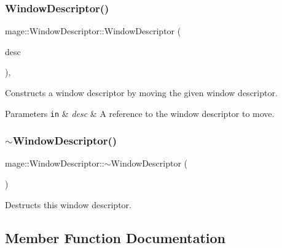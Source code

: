 \subsubsection{\texorpdfstring{Window\+Descriptor()}{WindowDescriptor()}\hspace{0.1cm}{\footnotesize\ttfamily [3/3]}}
{\footnotesize\ttfamily mage\+::\+Window\+Descriptor\+::\+Window\+Descriptor (\begin{DoxyParamCaption}\item[{\mbox{\hyperlink{classmage_1_1_window_descriptor}{Window\+Descriptor}} \&\&}]{desc }\end{DoxyParamCaption})\hspace{0.3cm}{\ttfamily [default]}, {\ttfamily [noexcept]}}

Constructs a window descriptor by moving the given window descriptor.


\begin{DoxyParams}[1]{Parameters}
\mbox{\tt in}  & {\em desc} & A reference to the window descriptor to move. \\
\hline
\end{DoxyParams}
\mbox{\label{classmage_1_1_window_descriptor_ac73160dd1e90b9acf819164b774d5709}} 
\subsubsection{\texorpdfstring{$\sim$\+Window\+Descriptor()}{~WindowDescriptor()}}
{\footnotesize\ttfamily mage\+::\+Window\+Descriptor\+::$\sim$\+Window\+Descriptor (\begin{DoxyParamCaption}{ }\end{DoxyParamCaption})}

Destructs this window descriptor. 

\subsection{Member Function Documentation}
\mbox{\label{classmage_1_1_window_descriptor_a09423845e3cc6bd451e280a92222ca14}} 
